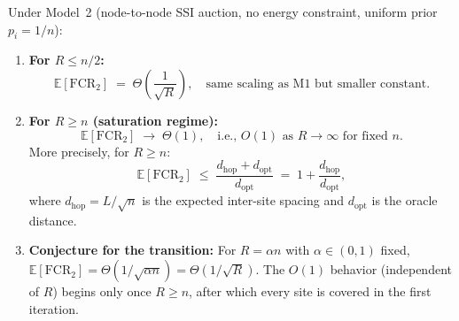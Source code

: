 \begin{theorem}\label{thm:m2-scaling}
Under Model~2 (node-to-node SSI auction, no energy constraint, uniform
prior $p_i = 1/n$):

\begin{enumerate}
  \item[(a)] \textbf{For $R \leq n/2$:}
    \begin{equation}
      \mathbb{E}[\mathrm{FCR}_2]
      \;=\; \Theta\!\left(\frac{1}{\sqrt{R}}\right),
      \quad \text{same scaling as M1 but smaller constant.}
    \end{equation}

  \item[(b)] \textbf{For $R \geq n$ (saturation regime):}
    \begin{equation}
      \mathbb{E}[\mathrm{FCR}_2]
      \;\to\; \Theta(1),
      \quad \text{i.e., } O(1) \text{ as } R \to \infty \text{ for fixed } n.
    \end{equation}
    More precisely, for $R \geq n$:
    \begin{equation}
      \mathbb{E}[\mathrm{FCR}_2]
      \;\leq\;
      \frac{d_{\mathrm{hop}} + d_{\mathrm{opt}}}{d_{\mathrm{opt}}}
      \;=\; 1 + \frac{d_{\mathrm{hop}}}{d_{\mathrm{opt}}},
    \end{equation}
    where $d_{\mathrm{hop}} = L/\sqrt{n}$ is the expected inter-site
    spacing and $d_{\mathrm{opt}}$ is the oracle distance.

  \item[(c)] \textbf{Conjecture for the transition:}
    For $R = \alpha n$ with $\alpha \in (0,1)$ fixed,
    $\mathbb{E}[\mathrm{FCR}_2] = \Theta(1/\sqrt{\alpha n}) = \Theta(1/\sqrt{R})$.
    The $O(1)$ behavior (independent of $R$) begins only once $R \geq n$,
    after which every site is covered in the first iteration.
\end{enumerate}
\end{theorem}

